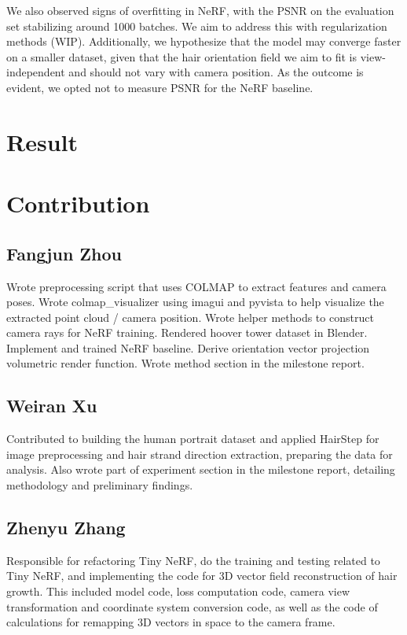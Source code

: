 \documentclass[12pt]{article}
\begin{document}

We also observed signs of overfitting in NeRF, with the PSNR on the evaluation set stabilizing around 1000 batches. We aim to address this with regularization methods (WIP). Additionally, we hypothesize that the model may converge faster on a smaller dataset, given that the hair orientation field we aim to fit is view-independent and should not vary with camera position. As the outcome is evident, we opted not to measure PSNR for the NeRF baseline.

\section{Result}


\printbibliography

\newpage

\section{Contribution}

\subsection{Fangjun Zhou}

Wrote preprocessing script that uses COLMAP to extract features and camera poses. Wrote colmap\_visualizer using imagui and pyvista to help visualize the extracted point cloud / camera position. Wrote helper methods to construct camera rays for NeRF training. Rendered hoover tower dataset in Blender. Implement and trained NeRF baseline. Derive orientation vector projection volumetric render function. Wrote method section in the milestone report.

\subsection{Weiran Xu}

Contributed to building the human portrait dataset and applied HairStep for image preprocessing and hair strand direction extraction, preparing the data for analysis. Also wrote part of experiment section in the milestone report, detailing methodology and preliminary findings.

\subsection{Zhenyu Zhang}

Responsible for refactoring Tiny NeRF, do the training and testing related to Tiny NeRF, and implementing the code for 3D vector field reconstruction of hair growth. This included model code, loss computation code, camera view transformation and coordinate system conversion code, as well as the code of calculations for remapping 3D vectors in space to the camera frame.
\end{document}
